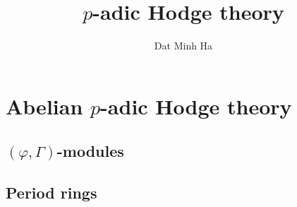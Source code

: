 

\setcounter{section}{-1}





	\title{\texorpdfstring{$p$}{}-adic Hodge theory}
	
	\author{Dat Minh Ha}
	\maketitle
	
	{
      \hypersetup{} 
      \tableofcontents %
    }
    
    
	
    \part{Abelian \texorpdfstring{$p$}{}-adic Hodge theory}
        \chapter{\texorpdfstring{$(\varphi, \Gamma)$}{}-modules}
            \begin{abstract}
                
            \end{abstract}
            
            \minitoc
            
            
            
               
            
        \chapter{Period rings}
            \begin{abstract}
                
            \end{abstract}
            
            \minitoc
            
            
            
            
            
